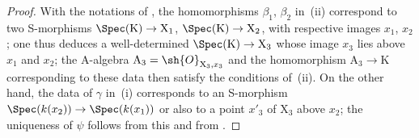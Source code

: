 \begin{proof}
With the notations of , the homomorphisms $\beta_1$, $\beta_2$ in~(ii) correspond to two S-morphisms $\Spec(\mathrm{K})\to\mathrm{X}_1$, $\Spec(\mathrm{K})\to\mathrm{X}_2$, with respective images $x_1$, $x_2$;
one thus deduces a well-determined $\Spec(\mathrm{K})\to\mathrm{X}_3$  whose image $x_3$ lies above $x_1$ and $x_2$;
the A-algebra $\mathrm{A}_3=\sh{O}_{\mathrm{X}_3,x_3}$ and the homomorphism $\mathrm{A}_3\to\mathrm{K}$ corresponding to these data then satisfy the conditions of~(ii).
On the other hand, the data of $\gamma$ in~(i) corresponds to an S-morphism $\Spec(k(x_2))\to\Spec(k(x_1))$ or also to a point $x'_3$ of $\mathrm{X}_3$ above $x_2$;
the uniqueness of $\psi$ follows from this and from .
\end{proof}

